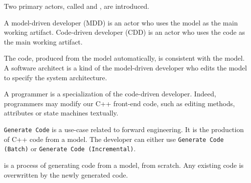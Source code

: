 Two primary actors, called 
and , are introduced.

\begin{definition}
	A model-driven developer (MDD) is an actor who uses the model as the main working artifact. Code-driven developer (CDD) is an actor who uses the code as the main working artifact.
\end{definition}

The code, produced from the model automatically, is consistent with the model.
A software architect is a kind of the model-driven developer
who edits the model to specify the system architecture.



A programmer is a specialization of the code-driven developer.
Indeed, programmers may modify our C++ front-end code, such as editing methods, attributes or state machines textually.



\texttt{Generate Code} is a use-case related to forward engineering.
It is the production of C++ code from a model.
The developer can either use \texttt{Generate Code (Batch)} or \texttt{Generate Code (Incremental)}.

\begin{definition}  \cite{Giese2006} is a process of generating code
	from a model, from scratch.
	Any existing code is overwritten by the newly generated code.
\end{definition}

